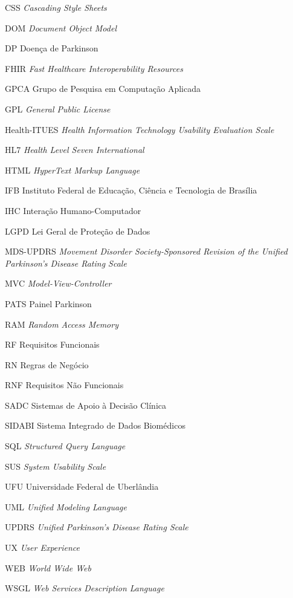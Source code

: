 
\begin{siglas}
    \item[CSS] \textit{Cascading Style Sheets}
    \item[DOM] \textit{Document Object Model}
    \item[DP]   Doença de Parkinson
    \item[FHIR] \textit{Fast Healthcare Interoperability Resources}
    \item[GPCA] Grupo de Pesquisa em Computação Aplicada
    \item[GPL] \textit{General Public License}
    \item[Health-ITUES] \textit{Health Information Technology Usability Evaluation Scale}
    \item[HL7] \textit{Health Level Seven International}
    \item[HTML] \textit{HyperText Markup Language}
    \item[IFB] Instituto Federal de Educação, Ciência e Tecnologia de Brasília
    \item[IHC] Interação Humano-Computador 
    \item[LGPD] Lei Geral de Proteção de Dados
    \item[MDS-UPDRS]\textit{Movement Disorder Society-Sponsored Revision of the Unified Parkinson's Disease Rating Scale}
    \item[MVC] \textit{Model-View-Controller}
    \item[PATS] Painel Parkinson
    \item[RAM] \textit{Random Access Memory}
    \item[RF] Requisitos Funcionais
    \item[RN] Regras de Negócio
    \item[RNF] Requisitos Não Funcionais
     \item[SADC] Sistemas de Apoio à Decisão Clínica 
    \item[SIDABI] Sistema Integrado de Dados Biomédicos
    \item[SQL] \textit{Structured Query Language}
    \item[SUS] \textit{System Usability Scale}
    \item[UFU] Universidade Federal de Uberlândia
    \item[UML] \textit{Unified Modeling Language}
    \item[UPDRS] \textit{Unified Parkinson's Disease Rating Scale}
    \item[UX] \textit{User Experience}
    \item[WEB] \textit{World Wide Web}
    \item[WSGL] \textit{Web Services Description Language}
\end{siglas}
